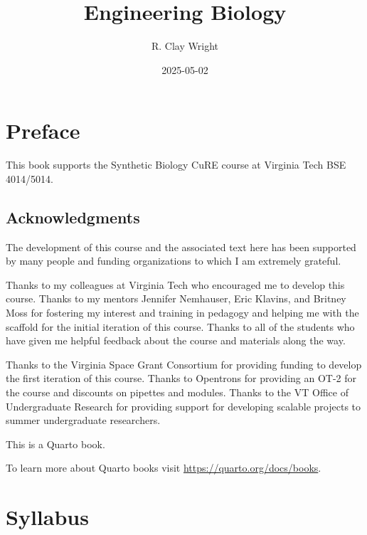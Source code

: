 \documentclass[
  letterpaper,
  DIV=11,
  numbers=noendperiod]{scrreprt}
\title{Engineering Biology}
\author{R. Clay Wright}
\date{2025-05-02}
\renewcommand*\contentsname{Table of contents}
\newcommand\contentsname{Table of contents}
\begin{document}
\maketitle

\renewcommand*\contentsname{Table of contents}
{
\hypersetup{linkcolor=}
\setcounter{tocdepth}{2}
\tableofcontents
}


\chapter*{Preface}\label{preface}


This book supports the Synthetic Biology CuRE course at Virginia Tech
BSE 4014/5014.

\section*{Acknowledgments}\label{acknowledgments}


The development of this course and the associated text here has been
supported by many people and funding organizations to which I am
extremely grateful.

Thanks to my colleagues at Virginia Tech who encouraged me to develop
this course. Thanks to my mentors Jennifer Nemhauser, Eric Klavins, and
Britney Moss for fostering my interest and training in pedagogy and
helping me with the scaffold for the initial iteration of this course.
Thanks to all of the students who have given me helpful feedback about
the course and materials along the way.

Thanks to the Virginia Space Grant Consortium for providing funding to
develop the first iteration of this course. Thanks to Opentrons for
providing an OT-2 for the course and discounts on pipettes and modules.
Thanks to the VT Office of Undergraduate Research for providing support
for developing scalable projects to summer undergraduate researchers.

This is a Quarto book.

To learn more about Quarto books visit
\url{https://quarto.org/docs/books}.


\chapter{Syllabus}\label{syllabus}
\end{document}
